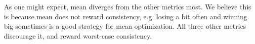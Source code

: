 As one might expect, mean diverges from the other metrics most. We believe this is because mean does not reward consistency, e.g. losing a bit often and winning big sometimes is a good strategy for mean optimization. All three other metrics discourage it, and reward worst-case consistency.
\begin{figure}[H]
\centering
{}
\end{figure}
